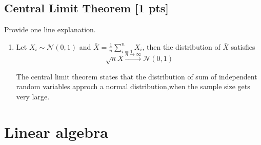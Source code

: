 \documentclass[a4paper]{article}
\theoremstyle{definition}
\newenvironment{soln}{
    \leavevmode\color{blue}\ignorespaces
}{}
\begin{document}
\subsection{Central Limit Theorem [1 pts]}
Provide one line explanation.
\begin{enumerate}
\item Let $X_i\sim\mathcal{N}(0, 1)$ and $\bar{X} = \frac{1}{n}\sum_{i=1}^n X_i$, then the distribution of $\bar{X}$ satisfies 
  $$\sqrt{n}\bar{X}\overset{n\rightarrow\infty}{\longrightarrow}\mathcal{N}(0, 1)$$
  \begin{soln}  
	
	The central limit theorem states that the distribution of sum of independent random variables approch a normal distribution,when the sample size gets very large.   

 \end{soln}
  
\end{enumerate}



\section{Linear algebra}
\end{document}
